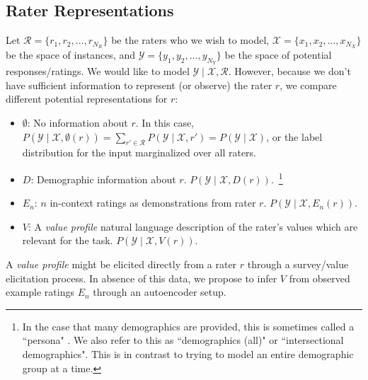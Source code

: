 \documentclass[11pt]{article}
\begin{document}
\subsection{Rater Representations}
Let $\mathcal{R} = \{r_1, r_2, \ldots, r_{N_R}\}$ be the raters who we wish to model, $\mathcal{X} = \{x_1, x_2, \ldots, x_{N_X}\}$ be the space of instances, and $\mathcal{Y} = \{y_1, y_2, \ldots, y_{N_Y}\}$ be the space of potential responses/ratings.
We would like to model 
$\mathcal{Y} \mid \mathcal{X}, \mathcal{R}$.
However, because we don't have sufficient information to represent (or observe) the rater $r$, we compare different potential representations for $r$:
\begin{itemize}
\item $\emptyset$: No information about $r$. In this case, 
$P(\mathcal{Y} \mid \mathcal{X}, \emptyset(r)) = \sum_{r' \in \mathcal{R}} P(\mathcal{Y} \mid \mathcal{X}, r') = P(\mathcal{Y} \mid \mathcal{X})$,
or the label distribution for the input marginalized over all raters.

\item $D$: Demographic information about $r$. $P(\mathcal{Y} \mid \mathcal{X}, D(r))$.~\footnote{In the case that many demographics are provided, this is sometimes called a ``persona" \citep{cheng-etal-2023-marked}. We also refer to this as ``demographics (all)" or ``intersectional demographics". This is in contrast to trying to model an entire demographic group at a time.
}

\item $E_n$: $n$ in-context ratings as demonstrations from rater $r$. $P(\mathcal{Y} \mid \mathcal{X}, E_n(r))$.

\item $V$: A {\em value profile} natural language description of the rater's values which are relevant for the task. $P(\mathcal{Y} \mid \mathcal{X}, V(r))$.
\end{itemize}


A {\em value profile} might be elicited directly from a rater $r$ through a survey/value elicitation process.
In absence of this data, we propose to infer $V$ from observed example ratings $E_n$ through an autoencoder setup.
\end{document}
